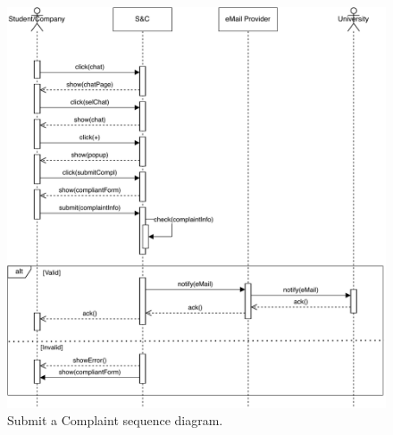 \begin{figure}[H]
    \begin{center}
        \includegraphics[width=\linewidth]{Images/SequenceDiagram/SubmitComplaintSD.pdf}
        \caption{Submit a Complaint sequence diagram.}
        \label{fig:submit_complaint_seqdiag}%
    \end{center}
\end{figure}


